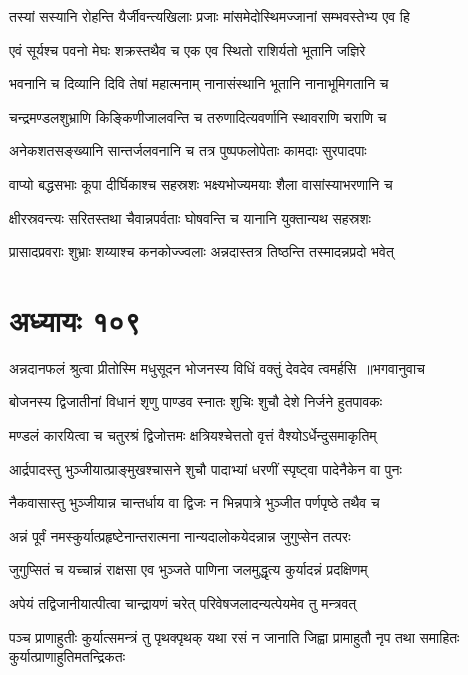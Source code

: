 \twolineshloka
{तस्यां सस्यानि रोहन्ति यैर्जीवन्त्यखिलाः प्रजाः}
{मांसमेदोस्थिमज्जानां सम्भवस्तेभ्य एव हि}


\twolineshloka
{एवं सूर्यश्च पवनो मेघः शक्रस्तथैव च}
{एक एव स्थितो राशिर्यतो भूतानि जज्ञिरे}


\twolineshloka
{भवनानि च दिव्यानि दिवि तेषां महात्मनाम्}
{नानासंस्थानि भूतानि नानाभूमिगतानि च}


\twolineshloka
{चन्द्रमण्डलशुभ्राणि किङ्किणीजालवन्ति च}
{तरुणादित्यवर्णानि स्थावराणि चराणि च}


\twolineshloka
{अनेकशतसङ्ख्यानि सान्तर्जलवनानि च}
{तत्र पुष्पफलोपेताः कामदाः सुरपादपाः}


\twolineshloka
{वाप्यो बद्धसभाः कूपा दीर्घिकाश्च सहस्रशः}
{भक्ष्यभोज्यमयाः शैला वासांस्याभरणानि च}


\twolineshloka
{क्षीरस्रवन्त्यः सरितस्तथा चैवान्नपर्वताः}
{घोषवन्ति च यानानि युक्तान्यथ सहस्रशः}


\twolineshloka
{प्रासादप्रवराः शुभ्राः शय्याश्च कनकोज्ज्वलाः}
{अन्नदास्तत्र तिष्ठन्ति तस्मादन्नप्रदो भवेत्}


\chapter{अध्यायः १०९}
\threelineshloka
{अन्नदानफलं श्रुत्वा प्रीतोस्मि मधुसूदन}
{भोजनस्य विधिं वक्तुं देवदेव त्वमर्हसि ॥भगवानुवाच}
{}


\twolineshloka
{बोजनस्य द्विजातीनां विधानं शृणु पाण्डव}
{स्नातः शुचिः शुचौ देशे निर्जने हुतपावकः}


\twolineshloka
{मण्डलं कारयित्वा च चतुरश्रं द्विजोत्तमः}
{क्षत्रियश्चेत्ततो वृत्तं वैश्योऽर्धेन्दुसमाकृतिम्}


\twolineshloka
{आर्द्रपादस्तु भुञ्जीयात्प्राङ्मुखश्चासने शुचौ}
{पादाभ्यां धरणीं स्पृष्ट्वा पादेनैकेन वा पुनः}


\twolineshloka
{नैकवासास्तु भुञ्जीयान्न चान्तर्धाय वा द्विजः}
{न भिन्नपात्रे भुञ्जीत पर्णपृष्ठे तथैव च}


\twolineshloka
{अन्नं पूर्वं नमस्कुर्यात्प्रहृष्टेनान्तरात्मना}
{नान्यदालोकयेदन्नान्न जुगुप्सेन तत्परः}


\twolineshloka
{जुगुप्सितं च यच्चान्नं राक्षसा एव भुञ्जते}
{पाणिना जलमुद्धृत्य कुर्यादन्नं प्रदक्षिणम्}


\twolineshloka
{अपेयं तद्विजानीयात्पीत्वा चान्द्रायणं चरेत्}
{परिवेषजलादन्यत्पेयमेव तु मन्त्रवत्}


पञ्च प्राणाहुतीः कुर्यात्समन्त्रं तु पृथक्पृथक्
\twolineshloka
{यथा रसं न जानाति जिह्वा प्रामाहुतौ नृप}
{तथा समाहितः कुर्यात्प्राणाहुतिमतन्द्रिकतः}


